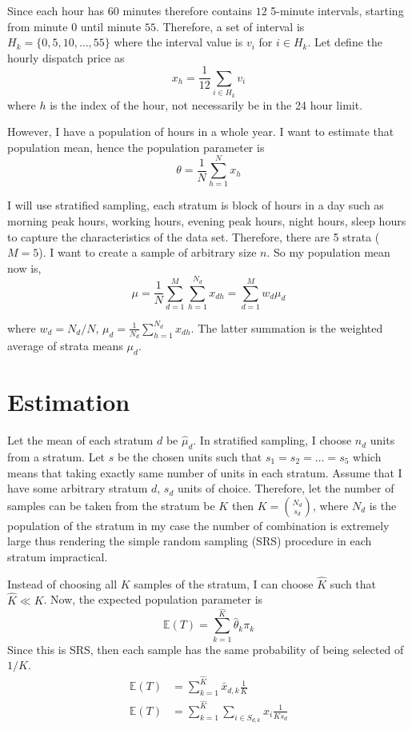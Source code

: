 \documentclass[11pt, a4paper]{article}
\begin{document}
Since each hour has $60$ minutes therefore contains $12$ 5-minute intervals, starting from minute $0$ until minute $55$. Therefore, a 
set of interval is $H_k=\{0,5,10,\ldots,55\}$ where the interval value is $v_i$ for $i\in H_k$. Let define the hourly dispatch price as
\begin{equation}
    x_h=\frac{1}{12}\sum_{i\in H_k}v_i
\end{equation}
where $h$ is the index of the hour, not necessarily be in the 24 hour limit.

However, I have a population of hours in a whole year. I want to estimate that population mean, hence the population parameter is 
\begin{equation}
    \theta = \frac1N\sum_{h=1}^{N}x_h
\end{equation}

I will use stratified sampling, each stratum is block of hours in a day such as morning peak hours, working hours, evening 
peak hours, night hours, sleep hours to capture the characteristics of the data set. Therefore, there are 5 strata ($M=5$). I want to create a sample 
of arbitrary size $n$. So my population mean now is,
\begin{equation}
    \mu=\frac1N\sum_{d=1}^{M}\sum_{h=1}^{N_d}x_{dh}=\sum_{d=1}^{M}w_d\mu_d
\end{equation}

where $w_d=N_d/N$, $\mu_d=\frac{1}{N_d}\sum_{h=1}^{N_d}x_{dh}$. The latter summation is the weighted average of strata means $\mu_d$.

\section*{Estimation}
Let the mean of each stratum $d$ be $\hat{\mu}_d$. In stratified sampling, I choose $n_d$ units from a stratum. Let $s$ be the chosen units such that $s_1=s_2=\ldots=s_5$ which means that taking exactly same number of 
units in each stratum. Assume that I have some arbitrary stratum $d$, $s_d$ units of choice. Therefore, let the number of samples can be taken from the stratum be $K$ then $K=\binom{N_d}{s_d}$, where $N_d$ is the 
population of the stratum in my case the number of combination is extremely large thus rendering the simple random sampling (SRS) procedure in each stratum impractical. 

Instead of choosing all $K$ samples of the stratum, I can choose $\hat{K}$ such that $\hat{K}\ll K$. Now, the expected population parameter is 
\begin{equation}
    \mathbb{E}(T)=\sum_{k=1}^{\hat{K}}\hat{\theta}_k\pi_k
\end{equation}
Since this is SRS, then each sample has the same probability of being selected of $1/K$.
\begin{equation}
    \begin{aligned}
        \mathbb{E}(T)&=\sum_{k=1}^{\hat{K}}\bar{x}_{d,k}\frac{1}{K}\\
        \mathbb{E}(T)&=\sum_{k=1}^{\hat{K}}\sum_{i\in S_{d,k}}x_i\frac{1}{Ks_d} 
    \end{aligned}
\end{equation}
\end{document}
